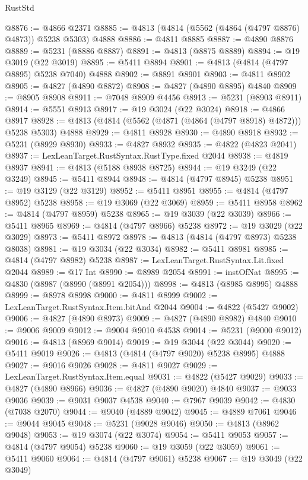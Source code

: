 \begin{lexlean}{RustStd}
\begin{coremodule}
@8876 := @4866 @2371
@8885 := @4813 (@4814 (@5562 (@4864 (@4797 @8876) @4873)) @5238 @5303) @4888
@8886 := @4811 @8885
@8887 := @4890 @8876
@8889 := @5231 (@8886 @8887)
@8891 := @4813 (@8875 @8889)
@8894 := @19 @3019 (@22 @3019)
@8895 := @5411 @8894
@8901 := @4813 (@4814 (@4797 @8895) @5238 @7040) @4888
@8902 := @8891 @8901
@8903 := @4811 @8902
@8905 := @4827 (@4890 @8872)
@8908 := @4827 (@4890 @8895) @4840
@8909 := @8905 @8908
@8911 := @7048 @8909 @4456
@8913 := @5231 (@8903 @8911)
@8914 := @5551 @8913
@8917 := @19 @3024 (@22 @3024)
@8918 := @4866 @8917
@8928 := @4813 (@4814 (@5562 (@4871 (@4864 (@4797 @8918) @4872))) @5238 @5303) @4888
@8929 := @4811 @8928
@8930 := @4890 @8918
@8932 := @5231 (@8929 @8930)
@8933 := @4827 @8932
@8935 := @4822 (@4823 @2041)
@8937 := LexLeanTarget.RustSyntax.RustType.fixed @2044
@8938 := @4819 @8937
@8941 := @4813 (@5188 @8938 @8725)
@8944 := @19 @3249 (@22 @3249)
@8945 := @5411 @8944
@8948 := @4814 (@4797 @8945) @5238
@8951 := @19 @3129 (@22 @3129)
@8952 := @5411 @8951
@8955 := @4814 (@4797 @8952) @5238
@8958 := @19 @3069 (@22 @3069)
@8959 := @5411 @8958
@8962 := @4814 (@4797 @8959) @5238
@8965 := @19 @3039 (@22 @3039)
@8966 := @5411 @8965
@8969 := @4814 (@4797 @8966) @5238
@8972 := @19 @3029 (@22 @3029)
@8973 := @5411 @8972
@8978 := @4813 (@4814 (@4797 @8973) @5238 @8038)
@8981 := @19 @3034 (@22 @3034)
@8982 := @5411 @8981
@8985 := @4814 (@4797 @8982) @5238
@8987 := LexLeanTarget.RustSyntax.Lit.fixed @2044
@8989 := @17 Int
@8990 := @8989 @2054
@8991 := instOfNat
@8995 := @4830 (@8987 (@8990 (@8991 @2054)))
@8998 := @4813 (@8985 @8995) @4888
@8999 := @8978 @8998
@9000 := @4811 @8999
@9002 := LexLeanTarget.RustSyntax.Item.bitAnd @2044
@9004 := @4822 (@5427 @9002)
@9006 := @4827 (@4890 @8973)
@9009 := @4827 (@4890 @8982) @4840
@9010 := @9006 @9009
@9012 := @9004 @9010 @4538
@9014 := @5231 (@9000 @9012)
@9016 := @4813 (@8969 @9014)
@9019 := @19 @3044 (@22 @3044)
@9020 := @5411 @9019
@9026 := @4813 (@4814 (@4797 @9020) @5238 @8995) @4888
@9027 := @9016 @9026
@9028 := @4811 @9027
@9029 := LexLeanTarget.RustSyntax.Item.equal
@9031 := @4822 (@5427 @9029)
@9033 := @4827 (@4890 @8966)
@9036 := @4827 (@4890 @9020) @4840
@9037 := @9033 @9036
@9039 := @9031 @9037 @4538
@9040 := @7967 @9039
@9042 := @4830 (@7038 @2070)
@9044 := @9040 (@4889 @9042)
@9045 := @4889 @7061
@9046 := @9044 @9045
@9048 := @5231 (@9028 @9046)
@9050 := @4813 (@8962 @9048)
@9053 := @19 @3074 (@22 @3074)
@9054 := @5411 @9053
@9057 := @4814 (@4797 @9054) @5238
@9060 := @19 @3059 (@22 @3059)
@9061 := @5411 @9060
@9064 := @4814 (@4797 @9061) @5238
@9067 := @19 @3049 (@22 @3049)

\end{coremodule}
\end{lexlean}
